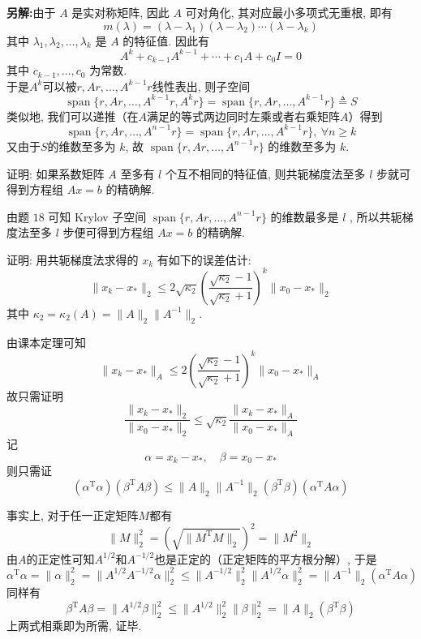 \documentclass[12pt, answers]{exam}     %
\newcommand{\anothersolution}{\par\noindent\textbf{另解:}}
\newcommand{\T}{\mathrm{T}}
\begin{document}
\begin{questions}
\begin{solution}
\anothersolution{}由于 \( A \) 是实对称矩阵, 因此 \( A \) 可对角化, 其对应最小多项式无重根, 即有
\[
m(\lambda) = (\lambda - \lambda_1)(\lambda - \lambda_2) \cdots (\lambda - \lambda_k)
\]
其中 \( \lambda_1, \lambda_2, \ldots, \lambda_k \) 是 \( A \) 的特征值. 因此有
\[
A^k + c_{k-1} A^{k-1} + \cdots + c_1 A + c_0 I = 0
\]
其中 \( c_{k-1}, \ldots, c_0 \) 为常数. \\
于是\( A^k \)可以被\(r, Ar, \ldots, A^{k-1}r\)线性表出, 则子空间 \[ \operatorname{span}\{r, Ar, \ldots, A^{k - 1}r, A^{k}r\} = \operatorname{span}\{r, Ar, \ldots, A^{k - 1}r\} \triangleq S \]
类似地, 我们可以递推（在$A$满足的等式两边同时左乘或者右乘矩阵\(A\)）得到 \[ \operatorname{span}\{r, Ar, \ldots, A^{n-1}r\} = \operatorname{span}\{r, Ar, \ldots, A^{k - 1}r\},\: \forall n \geq k \]
又由于\( S \)的维数至多为 \( k \), 
故 \( \operatorname{span}\{r, Ar, \ldots, A^{n-1}r\} \) 的维数至多为 \( k \). 

\end{solution}

\question{}证明: 如果系数矩阵 \( A \) 至多有 \( l \) 个互不相同的特征值, 则共轭梯度法至多 \( l \) 步就可得到方程组 \( Ax = b \) 的精确解. 

\begin{solution}
由题 \( 18 \) 可知 Krylov 子空间 \( \operatorname{span}\{r, Ar, \ldots, A^{n-1}r \} \) 的维数最多是 \( l \) , 所以共轭梯度法至多 \( l \) 步便可得到方程组 \( Ax = b \) 的精确解. 
\end{solution}

\question{}
证明: 用共轭梯度法求得的 \( x_k \) 有如下的误差估计: 
\[
\|x_k - x_*\|_2 \leq 2\sqrt{\kappa_2} \left( \frac{\sqrt{\kappa_2} - 1}{\sqrt{\kappa_2} + 1} \right)^k \|x_0 - x_*\|_2
\]
其中 \(\kappa_2 = \kappa_2(A) = \|A\|_2 \|A^{-1}\|_2\). 

\begin{solution}
由课本定理可知
\[
\|x_k - x_*\|_A \leq 2 \left( \frac{\sqrt{\kappa_2} - 1}{\sqrt{\kappa_2} + 1} \right)^k \|x_0 - x_*\|_A
\]
故只需证明
\[
\frac{\|x_k - x_*\|_2}{\|x_0 - x_*\|_2} \leq \sqrt{\kappa_2} \frac{\|x_k - x_*\|_A}{\|x_0 - x_*\|_A}
\]
记
\[
\alpha = x_k - x_*, \quad \beta = x_0 - x_*
\]
则只需证
\[
(\alpha^{\T}\alpha)(\beta^{\T} A\beta) \leq \|A\|_2 \|A^{-1}\|_2 (\beta^{\T}\beta)(\alpha^{\T} A\alpha)
\]

事实上, 对于任一正定矩阵$M$都有
\[
\| M \|_2^2 = (\sqrt{\| M^{\T}M \|_2})^2 = \| M^2 \|_2
\]
由\(A\)的正定性可知$A^{1/2}$和$A^{-1/2}$也是正定的（正定矩阵的平方根分解）, 于是 
\[
\alpha^{\T}\alpha = \|\alpha\|_2^2
= \|A^{1/2}A^{-1/2}\alpha\|_2^2
\leq \|A^{-1/2}\|_2^2 \|A^{1/2}\alpha\|_2^2
= \|A^{-1}\|_2 (\alpha^{\T} A\alpha)
\]
同样有 
\[
\beta^{\T} A\beta = \|A^{1/2}\beta\|_2^2
\leq \|A^{1/2}\|_2^2 \|\beta\|_2^2
= \|A\|_2 (\beta^{\T}\beta)
\]
上两式相乘即为所需, 证毕. 
\end{solution}



\end{questions}
\end{document}
